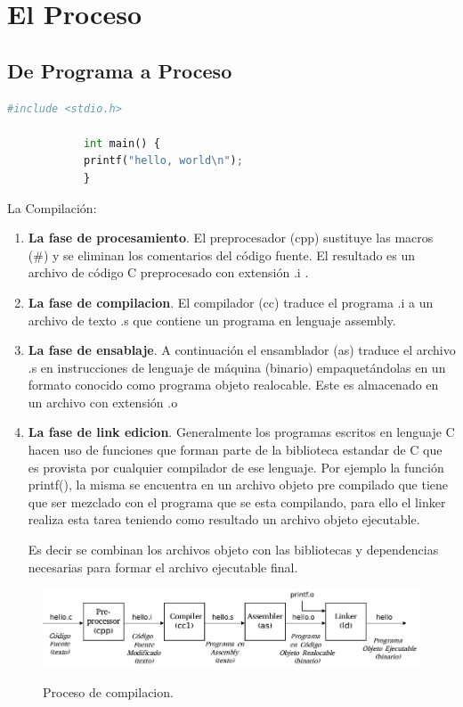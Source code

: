 \documentclass[../main.tex]{subfiles}
\begin{document}

\section{El Proceso}
    \subsection{De Programa a Proceso}
        \begin{lstlisting}[language=Python, caption=hola mundo.]
            #include <stdio.h>

            int main() {
            printf("hello, world\n");
            }
        \end{lstlisting}
    
        La Compilación:
        \begin{enumerate}
            \item \textbf{La fase de procesamiento}. El preprocesador (cpp) sustituye las macros (\#) y se eliminan los comentarios del código fuente. El resultado es un archivo de código C preprocesado con extensión .i .
            \item \textbf{La fase de compilacion}. El compilador (cc) traduce el programa .i a un archivo de texto .s que contiene un programa en lenguaje assembly.
            \item \textbf{La fase de ensablaje}. A continuación el ensamblador (as) traduce el archivo .s en instrucciones de lenguaje de máquina (binario) empaquetándolas en un formato conocido como programa objeto realocable. Este es almacenado en un archivo con extensión .o
            \item \textbf{La fase de link edicion}. Generalmente los programas escritos en lenguaje C hacen uso de funciones que forman parte de la biblioteca estandar de C que es provista por cualquier compilador de ese lenguaje. Por ejemplo la función printf(), la misma se encuentra en un archivo objeto pre compilado que tiene que ser mezclado con el programa que se esta compilando, para ello el linker realiza esta tarea teniendo como resultado un archivo objeto ejecutable. 
            
            Es decir se combinan los archivos objeto con las bibliotecas y dependencias necesarias para formar el archivo ejecutable final.
        \end{enumerate}

        \begin{figure}[bh]
            \centering
            \includegraphics[scale=0.33]{../images/compilation.jpg}
            \label{fig:img1}
            \caption{Proceso de compilacion.}
        \end{figure}
\end{document}
